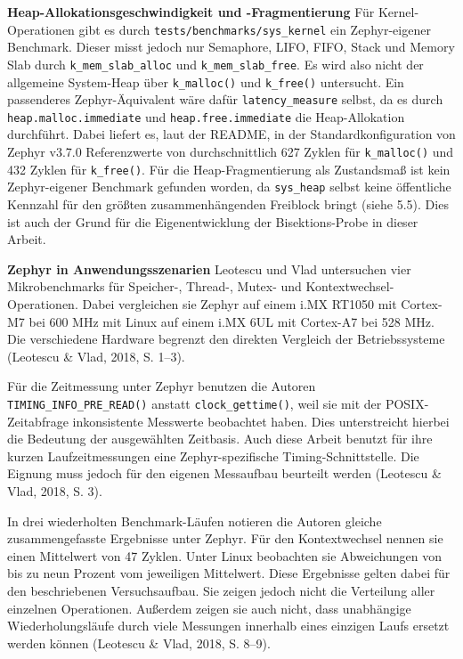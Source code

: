 \textbf{Heap-Allokationsgeschwindigkeit und -Fragmentierung }F{\"u}r Kernel-Operationen gibt es durch \lstinline[style=fileinline]|tests/benchmarks/sys_kernel| ein Zephyr-eigener Benchmark. Dieser misst jedoch nur Semaphore, LIFO, FIFO, Stack und Memory Slab durch \lstinline[style=fileinline]|k_mem_slab_alloc| und \lstinline[style=fileinline]|k_mem_slab_free|. Es wird also nicht der allgemeine System-Heap {\"u}ber \lstinline[style=fileinline]|k_malloc()| und \lstinline[style=fileinline]|k_free()| untersucht. Ein passenderes Zephyr-{\"A}quivalent w{\"a}re daf{\"u}r \lstinline[style=fileinline]|latency_measure| selbst, da es durch \lstinline[style=fileinline]|heap.malloc.immediate| und \lstinline[style=fileinline]|heap.free.immediate| die Heap-Allokation durchf{\"u}hrt. Dabei liefert es, laut der README, in der Standardkonfiguration von Zephyr v3.7.0 Referenzwerte von durchschnittlich 627 Zyklen f{\"u}r \lstinline[style=fileinline]|k_malloc()| und 432 Zyklen f{\"u}r \lstinline[style=fileinline]|k_free()|. F{\"u}r die Heap-Fragmentierung als Zustandsma{\ss} ist kein Zephyr-eigener Benchmark gefunden worden, da \lstinline[style=fileinline]|sys_heap| selbst keine {\"o}ffentliche Kennzahl f{\"u}r den gr{\"o}{\ss}ten zusammenh{\"a}ngenden Freiblock bringt (siehe 5.5). Dies ist auch der Grund f{\"u}r die Eigenentwicklung der Bisektions-Probe in dieser Arbeit.

\textbf{Zephyr in Anwendungsszenarien }Leotescu und Vlad untersuchen vier Mikrobenchmarks f{\"u}r Speicher-, Thread-, Mutex- und Kontextwechsel-Operationen. Dabei vergleichen sie Zephyr auf einem i.MX RT1050 mit Cortex-M7 bei 600 MHz mit Linux auf einem i.MX 6UL mit Cortex-A7 bei 528 MHz. Die verschiedene Hardware begrenzt den direkten Vergleich der Betriebssysteme (Leotescu \& Vlad, 2018, S. 1--3).

F{\"u}r die Zeitmessung unter Zephyr benutzen die Autoren \lstinline[style=fileinline]|TIMING_INFO_PRE_READ()| anstatt \lstinline[style=fileinline]|clock_gettime()|, weil sie mit der POSIX-Zeitabfrage inkonsistente Messwerte beobachtet haben. Dies unterstreicht hierbei die Bedeutung der ausgew{\"a}hlten Zeitbasis. Auch diese Arbeit benutzt f{\"u}r ihre kurzen Laufzeitmessungen eine Zephyr-spezifische Timing-Schnittstelle. Die Eignung muss jedoch f{\"u}r den eigenen Messaufbau beurteilt werden (Leotescu \& Vlad, 2018, S. 3).

In drei wiederholten Benchmark-L{\"a}ufen notieren die Autoren gleiche zusammengefasste Ergebnisse unter Zephyr. F{\"u}r den Kontextwechsel nennen sie einen Mittelwert von 47 Zyklen. Unter Linux beobachten sie Abweichungen von bis zu neun Prozent vom jeweiligen Mittelwert. Diese Ergebnisse gelten dabei f{\"u}r den beschriebenen Versuchsaufbau. Sie zeigen jedoch nicht die Verteilung aller einzelnen Operationen. Au{\ss}erdem zeigen sie auch nicht, dass unabh{\"a}ngige Wiederholungsl{\"a}ufe durch viele Messungen innerhalb eines einzigen Laufs ersetzt werden k{\"o}nnen (Leotescu \& Vlad, 2018, S. 8--9).

